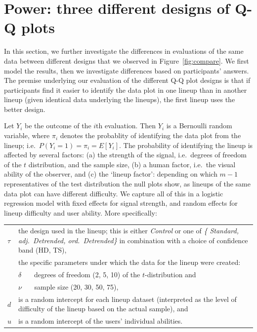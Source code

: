 \documentclass[12pt]{article}\usepackage[]{graphicx}\usepackage[]{color}
\newcommand{\hh}[1]{{\color{magenta} #1}}
\begin{document}
\section{Power: three different designs of Q-Q plots}\label{sec:power1}

In this section, we further investigate the differences in evaluations of the same data between different designs that we observed in Figure~\ref{fig:compare}. We first model the results, then we investigate differences based on participants' answers.
The premise underlying our evaluation of the different Q-Q plot designs is that if participants find it easier to identify the data plot in one lineup than in another lineup (given identical data underlying the lineups), the first lineup uses the better design.

Let $Y_i$ be the outcome of the $i$th evaluation. Then $Y_i$ is a Bernoulli random variable, where $\pi_i$ denotes the probablity of identifying the data plot from the lineup; i.e.~$P(Y_i = 1) = \pi_i = E[Y_i]$.   
The probability of identifying the lineup is affected by several factors: (a) the strength of the signal, i.e.~degrees of freedom of the $t$ distribution, and the sample size, (b) a human factor, i.e.~the visual ability of the observer, and (c)  the `lineup factor': depending on which $m-1$ representatives of the test distribution the null plots show, as lineups of the same data plot can have different difficulty. We capture all of this in a logistic regression model with fixed effects for signal strength, and random effects for lineup difficulty and user ability. More specifically: 


\begin{center}
\begin{tabular}{lp{5in}}
$\tau$ & the design used in the lineup; this is either {\it Control} or one of  {\it \{  Standard, adj.\ Detrended, ord.\ Detrended\}} in combination with a choice of confidence band (HD, TS), \\
&  the specific parameters under which the data for the lineup were created: \\
&  $\delta$ \ \ \ degrees of freedom (2, 5, 10) {of the $t$-distribution} and \\
&  $\nu$  \ \ \ sample size (20, 30, 50, 75), \\
$d$ & \hh{is a random intercept for each lineup dataset (interpreted as} the level of difficulty of the lineup based on the actual sample), and \\
$u$ & \hh{is a random intercept of} the users' individual abilities.
 \end{tabular}
\end{center}
%
\end{document}
